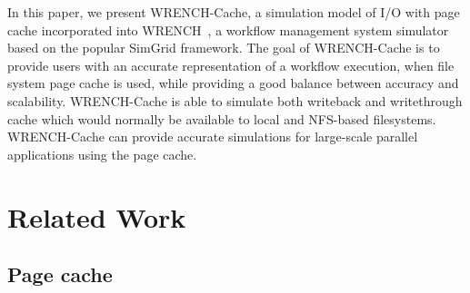 \documentclass[conference]{IEEEtran}
\begin{document}

        In this paper, we present WRENCH-Cache, a simulation model of I/O with page
        cache incorporated into WRENCH~\cite{casanova2018wrench}, a workflow management system simulator based on
        the popular SimGrid framework. The goal of WRENCH-Cache is to provide users
        with an accurate representation of a workflow execution, when file system page
        cache is used, while providing a good balance between accuracy and scalability.
        WRENCH-Cache is able to simulate both writeback and writethrough
        cache which would normally be available to local and NFS-based filesystems.
        WRENCH-Cache can provide accurate simulations for large-scale parallel
        applications using the page cache.
         



        
		
    \section{Related Work}        
    \label{relatedwork}    
        
        \subsection{Page cache}
            
\end{document}
